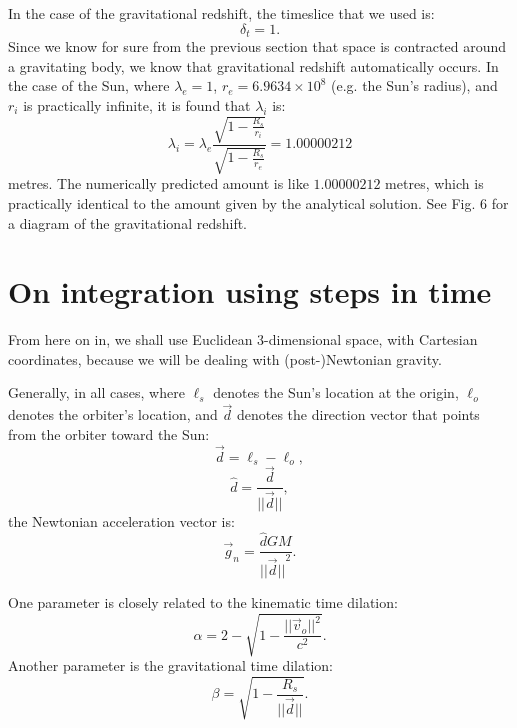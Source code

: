 \documentclass[12pt]{article}
\begin{document}
In the case of the gravitational redshift, the timeslice that we used is:
\begin{equation}
\label{dt_1_too}
\delta_{t} = 1.
\end{equation}
Since we know for sure from the previous section that space is contracted around a gravitating body, we know that gravitational redshift automatically occurs.
In the case of the Sun, where $\lambda_{e} = 1$, $r_e = 6.9634 \times 10^8$ (e.g. the Sun's radius), and $r_i$ is practically infinite, it is found that $\lambda_{i}$ is:
\begin{equation}
\label{wl_inf}
\lambda_{i} = \lambda_{e} \frac{        \sqrt{1 - \frac{R_s}{r_i}     }  }{  \sqrt{       1 - \frac{R_s}{r_e}     } } = 1.00000212
\end{equation}
metres.
The numerically predicted amount is like $1.00000212$ metres, which is practically identical to the amount given by the analytical solution.
See Fig. 6 for a diagram of the gravitational redshift.






\section{On integration using steps in time}

From here on in, we shall use Euclidean 3-dimensional space, with Cartesian coordinates, because we will be dealing with (post-)Newtonian gravity.

Generally, in all cases, where $\ell_s$ denotes the Sun's location at the origin, $\ell_o$ denotes the orbiter's location, and $\vec{d}$ denotes the direction vector that points from the orbiter toward the Sun:
\begin{equation}
\label{direction_vector}
\vec{d} = \ell_{s} - \ell_{o},	
\end{equation}
\begin{equation}
\label{direction_unit_vector}
\hat{d} = \frac{\vec{d}}{\lvert\lvert \vec{d} \rvert\rvert},
\end{equation}
the Newtonian acceleration vector is:
\begin{equation}
\label{newton}
\vec{g}_n = \frac{\hat{d} G M}{{\lvert\lvert \vec{d} \rvert\rvert}^2}.
\end{equation}

One parameter is closely related to the kinematic time dilation:
\begin{equation}
\label{eq_kinematic}
\alpha = 2 - \sqrt{1 - \frac{\lvert\lvert \vec{v}_{o}\rvert\rvert^2}{c^2}}.
\end{equation}
Another parameter is the gravitational time dilation:
\begin{equation}
\label{eq_gravitational}
\beta = \sqrt{1 - \frac{R_{s}}{\lvert \lvert \vec{d} \rvert \rvert}}.
\end{equation}
\end{document}
